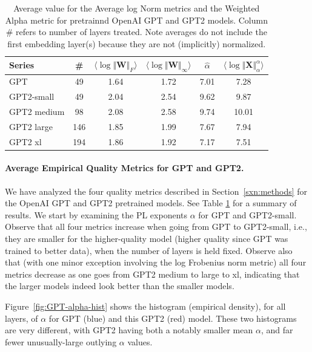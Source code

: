 \begin{table}[t]
\small
\begin{center}
\begin{tabular}{|p{0.75in}|c|c|c|c|c|}
\hline
 Series  & \#   & $\langle\log\Vert\mathbf{W}\Vert_{F}\rangle$ & $\langle\log\Vert\mathbf{W}\Vert_{\infty}\rangle$ & $\hat{\alpha}$ & $\langle\log\Vert\mathbf{X}\Vert^{\alpha}_{\alpha}\rangle$ \\
\hline
GPT & 49 & 1.64  & 1.72 & 7.01 & 7.28 \\
GPT2-small & 49 & 2.04  & 2.54& 9.62 & 9.87 \\
\hline
GPT2 medium & 98 & 2.08 & 2.58& 9.74 & 10.01 \\
GPT2 large & 146 & 1.85 & 1.99& 7.67 & 7.94 \\
GPT2 xl & 194 & 1.86 & 1.92 & 7.17 & 7.51 \\
\hline
\end{tabular}
\end{center}
\caption{Average value for the Average log Norm metrics and the Weighted Alpha metric for pretrainnd OpenAI GPT and GPT2 models. Column \# refers to number of layers treated.  Note averages do not include the first embedding layer(s) because they are not (implicitly) normalized.  }
\label{table:nlp}
\end{table}


\paragraph{Average Empirical Quality Metrics for GPT and GPT2.}

We have analyzed the four quality metrics described in Section~\ref{sxn:methods} for the OpenAI GPT and GPT2 pretrained models.
See Table \ref{table:nlp} for a summary of results.
We start by examining the PL exponents $\alpha$ for GPT and GPT2-small.
Observe that all four metrics increase when going from GPT to GPT2-small, i.e., they are smaller for the higher-quality model (higher quality since GPT was trained to better data), when the number of layers is held fixed.
Observe also that (with one minor exception involving the log Frobenius norm metric) all four metrics decrease as one goes from GPT2 medium to large to xl, indicating that the larger models indeed look better than the smaller models.

Figure~\ref{fig:GPT-alpha-hist} shows the histogram (empirical density), for all layers, of $\alpha$ for GPT (blue) and this GPT2 (red) model.  
These two histograms are very different, with GPT2 having both a notably smaller mean $\alpha$, and far fewer unusually-large outlying $\alpha$ values.

